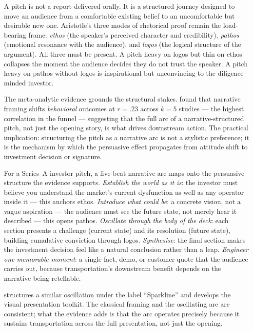 A pitch is not a report delivered orally. It is a structured journey designed to move an
audience from a comfortable existing belief to an uncomfortable but desirable new one.
Aristotle's three modes of rhetorical proof remain the load-bearing frame: \emph{ethos}
(the speaker's perceived character and credibility), \emph{pathos} (emotional resonance
with the audience), and \emph{logos} (the logical structure of the argument). All three
must be present. A pitch heavy on logos but thin on ethos collapses the moment the
audience decides they do not trust the speaker. A pitch heavy on pathos without logos is
inspirational but unconvincing to the diligence-minded investor.

The meta-analytic evidence grounds the structural stakes. \textcite{braddock2016narrative}
found that narrative framing shifts \emph{behavioral} outcomes at \(r = .23\) across
\(k = 5\) studies — the highest correlation in the funnel — suggesting that the full arc
of a narrative-structured pitch, not just the opening story, is what drives downstream
action. %
The practical implication: structuring the pitch as a narrative arc is not a stylistic
preference; it is the mechanism by which the persuasive effect propagates from attitude
shift to investment decision or signature.

For a Series~A investor pitch, a five-beat narrative arc maps onto the persuasive
structure the evidence supports. \emph{Establish the world as it is}: the investor must
believe you understand the market's current dysfunction as well as any operator inside it
— this anchors ethos. \emph{Introduce what could be}: a concrete vision, not a vague
aspiration — the audience must see the future state, not merely hear it described —
this opens pathos. \emph{Oscillate through the body of the deck}: each section presents
a challenge (current state) and its resolution (future state), building cumulative
conviction through logos. \emph{Synthesise}: the final section makes the investment
decision feel like a natural conclusion rather than a leap. \emph{Engineer one memorable
moment}: a single fact, demo, or customer quote that the audience carries out, because
transportation's downstream benefit depends on the narrative being retellable.

\textcite{duarte2010resonate} structures a similar oscillation under the label ``Sparkline''
and develops the visual presentation toolkit. The classical framing and the oscillating
arc are consistent; what the evidence adds is that the arc operates precisely because it
sustains transportation across the full presentation, not just the opening.


